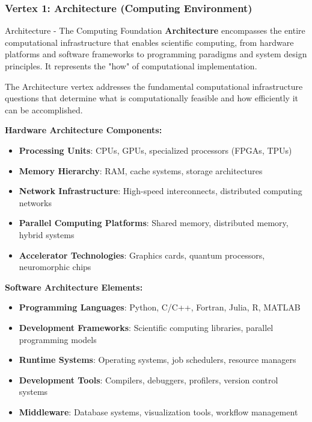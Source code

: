 \subsubsection{Vertex 1: Architecture (Computing Environment)}

\begin{conceptcard}{Architecture - The Computing Foundation}
\textbf{Architecture} encompasses the entire computational infrastructure that enables scientific computing, from hardware platforms and software frameworks to programming paradigms and system design principles. It represents the "how" of computational implementation.
\end{conceptcard}

The Architecture vertex addresses the fundamental computational infrastructure questions that determine what is computationally feasible and how efficiently it can be accomplished.

\textbf{Hardware Architecture Components:}
\begin{itemize}
    \item \textbf{Processing Units}: CPUs, GPUs, specialized processors (FPGAs, TPUs)
    \item \textbf{Memory Hierarchy}: RAM, cache systems, storage architectures
    \item \textbf{Network Infrastructure}: High-speed interconnects, distributed computing networks
    \item \textbf{Parallel Computing Platforms}: Shared memory, distributed memory, hybrid systems
    \item \textbf{Accelerator Technologies}: Graphics cards, quantum processors, neuromorphic chips
\end{itemize}

\textbf{Software Architecture Elements:}
\begin{itemize}
    \item \textbf{Programming Languages}: Python, C/C++, Fortran, Julia, R, MATLAB
    \item \textbf{Development Frameworks}: Scientific computing libraries, parallel programming models
    \item \textbf{Runtime Systems}: Operating systems, job schedulers, resource managers
    \item \textbf{Development Tools}: Compilers, debuggers, profilers, version control systems
    \item \textbf{Middleware}: Database systems, visualization tools, workflow management
\end{itemize}

